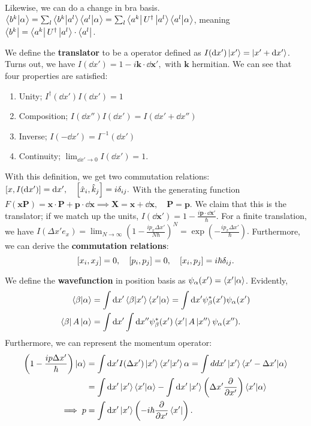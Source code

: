 \documentclass{article}
\begin{document}
Likewise, we can do a change in bra basis. $\braket{b^k}{\alpha}=\sum_l\braket{b^k}{a^l}\braket{a^l}{\alpha}=\sum_l\bra{a^k}U^\dag\ket{a^l}\braket{a^l}{\alpha}$, meaning $\bra{b^k}=\bra{a^k}U^\dag\ket{a^l}\cdot\bra{a^l}$. 

We define the \textbf{translator} to be a operator defined as $I(\dd x')\ket{x'}=\ket{x'+\dd x'}$. Turns out, we have $I(\dd x')=1-i\mathbf k\cdot\dd\mathbf x',$ with $\mathbf k$ hermitian. We can see that four properties are satisfied:
\begin{enumerate}
    \item Unity; $I^\dag(\dd x')I(\dd x')=1$
    \item Composition; $I(\dd x'')I(\dd x')=I(\dd x'+\dd x'')$
    \item Inverse; $I(-\dd x')=I^{-1}(\dd x')$
    \item Continuity; $\lim_{\dd x'\to 0}I(\dd x')=1$.
\end{enumerate}
With this definition, we get two commutation relations: $\comm{x}{I(\dd x')}=\dd x',\quad \comm{\hat x_i}{\hat k_j}=i\delta_{ij}.$
With the generating function $F(\mathbf x\mathbf P)=\mathbf x\cdot\mathbf P+\mathbf p\cdot\dd\mathbf x\implies \mathbf X=\mathbf x+\dd\mathbf x,\quad\mathbf P=\mathbf p.$ We claim that this is the translator; if we match up the units, $I(\dd\mathbf x')=1-\frac{i\mathbf p\cdot\dd\mathbf x'}{\hbar}$. For a finite translation, we have $I(\Delta x'e_x)=\lim_{N\to\infty}\left(1-\frac{ip_x\Delta x'}{N\hbar}\right)^N=\exp\left(-\frac{ip_x\Delta x'}\hbar\right).$ Furthermore, we can derive the \textbf{commutation relations}:
$$\comm{x_i}{x_j}=0,\quad\comm{p_i}{p_j}=0,\quad\comm{x_i}{p_j}=i\hbar\delta_{ij}.$$

We define the \textbf{wavefunction} in position basis as $\psi_\alpha(x')=\braket{x'}{\alpha}$. Evidently, 
\begin{align*}
    \braket{\beta}{\alpha}&=\int\dd x'\braket{\beta}{x'}\braket{x'}{\alpha}=\int\dd x'\psi^*_\beta(x')\psi_\alpha(x')\\
    \bra{\beta}A\ket{\alpha}&=\int\dd x'\int\dd x''\psi^*_\beta(x')\bra{x'}A\ket{x''}\psi_\alpha(x'').
\end{align*}
Furthermore, we can represent the momentum operator:
\begin{align*}
    \left(1-\frac{ip\Delta x'}\hbar\right)\ket\alpha&=\int\dd x'I(\Delta x')\ket{x'}\braket{x'}\alpha=\int ddx'\ket{x'}\braket{x'-\Delta x'}{\alpha}\\
    &=\int\dd x'\ket{x'}\braket{x'}{\alpha}-\int\dd x'\ket{x'}\left(\Delta x' \frac{\partial }{\partial x'}\right)\braket{x'}{\alpha}\\
    \implies p&=\int\dd x'\ket{x'}\left(-i\hbar \frac{\partial }{\partial x'}\bra{x'}\right).
\end{align*}
\end{document}
